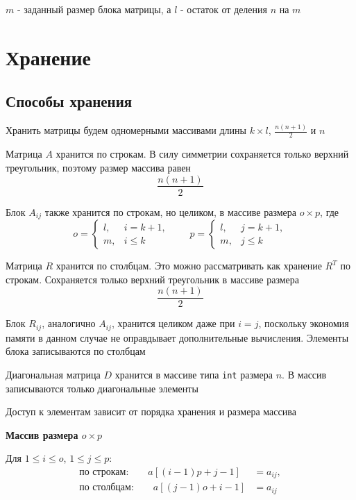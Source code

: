 \documentclass[a4paper,12pt]{article}
\begin{document}
$m$ - заданный размер блока матрицы, а $l$ - остаток от деления $n$ на $m$

\section{Хранение}

\subsection{Способы хранения}

Хранить матрицы будем одномерными массивами длины
$k \times l$, $\frac{n(n+1)}{2}$ и $n$

\medskip

Матрица $A$ хранится по строкам. В силу симметрии сохраняется только
верхний треугольник, поэтому размер массива равен
$$
\frac{n(n+1)}{2}
$$

Блок $A_{ij}$ также хранится по строкам, но целиком, в массиве размера
$o \times p$, где
$$
o =
\begin{cases}
  l, & i = k+1, \\
  m, & i \leq k
\end{cases}
\qquad
p =
\begin{cases}
  l, & j = k+1, \\
  m, & j \leq k
\end{cases}
$$

\medskip

Матрица $R$ хранится по столбцам. Это можно рассматривать как
хранение $R^T$ по строкам. Сохраняется только верхний треугольник
в массиве размера
$$
\frac{n(n+1)}{2}
$$

Блок $R_{ij}$, аналогично $A_{ij}$, хранится целиком даже при
$i=j$, поскольку экономия памяти в данном случае не оправдывает
дополнительные вычисления. Элементы блока записываются по столбцам

\medskip

Диагональная матрица $D$ хранится в массиве типа \texttt{int}
размера $n$. В массив записываются только диагональные элементы

\medskip

Доступ к элементам зависит от порядка хранения и размера массива

\medskip
\noindent
\textbf{Массив размера $o \times p$}

Для $1 \leq i \leq o$, $1 \leq j \leq p$:
$$
\begin{aligned}
  \text{по строкам:}\qquad
  a[(i-1)p+j-1] &= a_{ij}, \\
  \text{по столбцам:}\qquad
  a[(j-1)o+i-1] &= a_{ij}
\end{aligned}
$$
\end{document}

